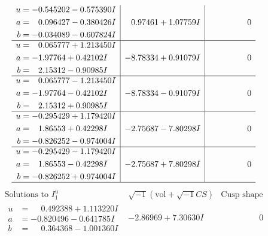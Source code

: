 \documentclass[1p]{elsarticle_modified}
\theoremstyle{definition}
\newcommand{\I}{\sqrt{-1}}
\begin{document}
$$\begin{array}{c|c|c}
\begin{aligned}
u &= -0.545202 - 0.575390 I \\
a &= \phantom{-}0.096427 - 0.380426 I \\
b &= -0.034089 - 0.607824 I\end{aligned}
 & \phantom{-}0.97461 + 1.07759 I & \phantom{-0.000000 } 0 \\ \hline\begin{aligned}
u &= \phantom{-}0.065777 + 1.213450 I \\
a &= -1.97764 + 0.42102 I \\
b &= \phantom{-}2.15312 - 0.90985 I\end{aligned}
 & -8.78334 + 0.91079 I & \phantom{-0.000000 } 0 \\ \hline\begin{aligned}
u &= \phantom{-}0.065777 - 1.213450 I \\
a &= -1.97764 - 0.42102 I \\
b &= \phantom{-}2.15312 + 0.90985 I\end{aligned}
 & -8.78334 - 0.91079 I & \phantom{-0.000000 } 0 \\ \hline\begin{aligned}
u &= -0.295429 + 1.179420 I \\
a &= \phantom{-}1.86553 + 0.42298 I \\
b &= -0.826252 - 0.974004 I\end{aligned}
 & -2.75687 - 7.80298 I & \phantom{-0.000000 } 0 \\ \hline\begin{aligned}
u &= -0.295429 - 1.179420 I \\
a &= \phantom{-}1.86553 - 0.42298 I \\
b &= -0.826252 + 0.974004 I\end{aligned}
 & -2.75687 + 7.80298 I & \phantom{-0.000000 } 0\\
 \hline 
 \end{array}$$\newpage$$\begin{array}{c|c|c}  
\text{Solutions to }I^u_{1}& \I (\text{vol} + \sqrt{-1}CS) & \text{Cusp shape}\\
 \hline 
\begin{aligned}
u &= \phantom{-}0.492388 + 1.113220 I \\
a &= -0.820496 - 0.641785 I \\
b &= \phantom{-}0.364368 - 1.001360 I\end{aligned}
 & -2.86969 + 7.30630 I & \phantom{-0.000000 } 0 \\ \hline\begin{aligned}

\end{aligned}
\end{array}$$
\end{document}
